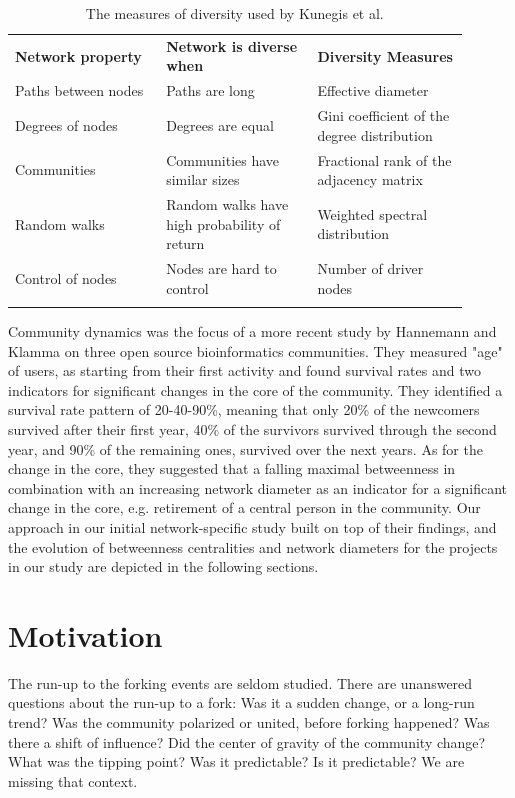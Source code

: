 \documentclass{acm_proc_article-sp}
\begin{document}
\begin{table}[!htbp]
\centering
\caption{The measures of diversity used by Kunegis et al. \cite{Kunegis}}
\label{TableDiversityMeasuresKunegisEtAl}
\begin{tabular}{p{0.3\linewidth} p{0.3\linewidth} p{0.3\linewidth}}
\hline\noalign{\smallskip}
\textbf{Network property} & \textbf{Network is diverse when} & \textbf{Diversity Measures} \\
\noalign{\smallskip}\hline\noalign{\smallskip}
Paths between nodes & Paths are long & Effective diameter \\ \hline
Degrees of nodes  & Degrees are equal & Gini coefficient of the degree distribution \\ \hline
Communities  & Communities have similar sizes & Fractional rank of the adjacency matrix \\ \hline
Random walks  & Random walks have high probability of return & Weighted spectral distribution \\ \hline
Control of nodes  & Nodes are hard to control & Number of driver nodes \\
\noalign{\smallskip}\hline
\end{tabular}
\end{table}

Community dynamics was the focus of a more recent study by Hannemann and Klamma \cite{Hannemann} on three open source bioinformatics communities. They measured "age" of users, as starting from their first activity and found survival rates and two indicators for significant changes in the core of the community. They identified a survival rate pattern of 20-40-90\%, meaning that only 20\% of the newcomers survived after their first year, 40\% of the survivors survived through the second year, and 90\% of the remaining ones, survived over the next years. As for the change in the core, they suggested that a falling maximal betweenness in combination with an increasing network diameter as an indicator for a significant change in the core, e.g. retirement of a central person in the community. Our approach in our initial network-specific study built on top of their findings, and the evolution of betweenness centralities and network diameters for the projects in our study are depicted in the following sections.

\section{Motivation}
\label{motivation}
The run-up to the forking events are seldom studied. There are unanswered questions about the run-up to a fork: Was it a sudden change, or a long-run trend? Was the community polarized or united, before forking happened? Was there a shift of influence? Did the center of gravity of the community change? What was the tipping point? Was it predictable? Is it predictable? We are missing that context. 
\end{document}
